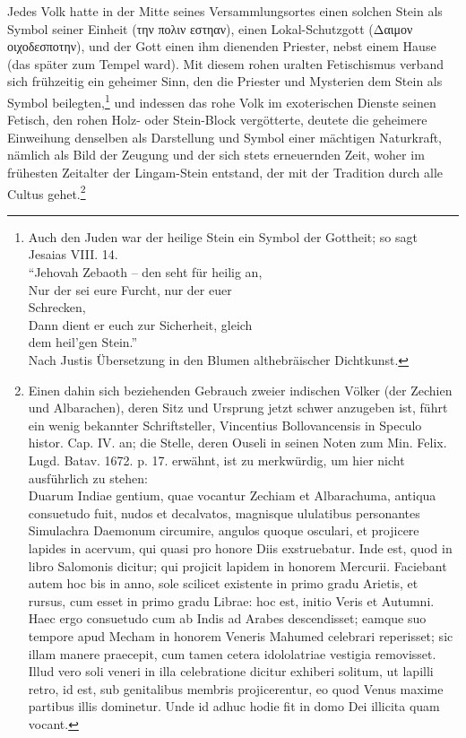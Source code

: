 \documentclass[a4paper, 11pt, oneside, polutonikogreek, german]{article}
\begin{document}
Jedes Volk hatte in der Mitte seines Versammlungsortes einen solchen Stein als Symbol seiner Einheit (την πολιν εστηαν), einen Lokal-Schutzgott (Δαιμον οιχοδεσποτην), und der Gott einen ihm dienenden Priester, nebst einem Hause (das später zum Tempel ward). Mit diesem rohen uralten Fetischismus verband sich frühzeitig ein geheimer Sinn, den die Priester und Mysterien dem Stein als Symbol beilegten,\footnote{Auch den Juden war der heilige Stein ein Symbol der Gottheit; so sagt Jesaias VIII. 14.\\
"`Jehovah Zebaoth -- den seht für heilig an,\\
Nur der sei eure Furcht, nur der euer\\
\hspace*{1cm} Schrecken,\\
Dann dient er euch zur Sicherheit, gleich\\
\hspace*{1cm} dem heil'gen Stein."'\\
Nach Justis Übersetzung in den Blumen althebräischer Dichtkunst.} und indessen das rohe Volk im exoterischen Dienste seinen Fetisch, den rohen Holz- oder Stein-Block vergötterte, deutete die geheimere Einweihung denselben als Darstellung und Symbol einer mächtigen Naturkraft, nämlich als Bild der Zeugung und der sich stets erneuernden Zeit, woher im frühesten Zeitalter der Lingam-Stein entstand, der mit der Tradition durch alle Cultus gehet.\footnote{Einen dahin sich beziehenden Gebrauch zweier indischen Völker (der Zechien und Albarachen), deren Sitz und Ursprung jetzt schwer anzugeben ist, führt ein wenig bekannter Schriftsteller, Vincentius Bollovancensis in Speculo histor. Cap. IV. an; die Stelle, deren Ouseli in seinen Noten zum Min. Felix. Lugd. Batav. 1672. p. 17. erwähnt, ist zu merkwürdig, um hier nicht ausführlich zu stehen:\\
\hspace*{0.5cm} Duarum Indiae gentium, quae vocantur Zechiam et Albarachuma, antiqua consuetudo fuit, nudos et decalvatos, magnisque ululatibus personantes Simulachra Daemonum circumire, angulos quoque osculari, et projicere lapides in acervum, qui quasi pro honore Diis exstruebatur. Inde est, quod in libro Salomonis dicitur; qui projicit lapidem in honorem Mercurii. Faciebant autem hoc bis in anno, sole scilicet existente in primo gradu Arietis, et rursus, cum esset in primo gradu Librae: hoc est, initio Veris et Autumni. Haec ergo consuetudo cum ab Indis ad Arabes descendisset; eamque suo tempore apud Mecham in honorem Veneris Mahumed celebrari reperisset; sic illam manere praecepit, cum tamen cetera idololatriae vestigia removisset. Illud vero soli veneri in illa celebratione dicitur exhiberi solitum, ut lapilli retro, id est, sub genitalibus membris projicerentur, eo quod Venus maxime partibus illis dominetur. Unde id adhuc hodie fit in domo Dei illicita quam vocant.}
\end{document}
